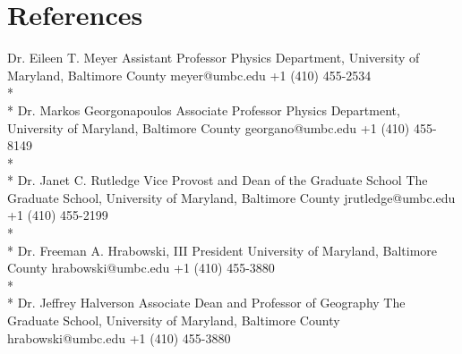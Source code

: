 %
%
%

\section{\texorpdfstring{\color{Blue}References}{References}}

\begin{referees}
		{Dr. Eileen T. Meyer}
		{Assistant Professor}
		{Physics Department, University of Maryland, Baltimore County}
		{meyer@umbc.edu}
		{+1 (410) 455-2534}\\*\\*
		{Dr. Markos Georgonapoulos}
		{Associate Professor}
		{Physics Department, University of Maryland, Baltimore County}
		{georgano@umbc.edu}
		{+1 (410) 455-8149}\\*\\*
		{Dr. Janet C. Rutledge}
		{Vice Provost and Dean of the Graduate School}
		{The Graduate School, University of Maryland, Baltimore County}
		{jrutledge@umbc.edu}
		{+1 (410) 455-2199}\\*\\*
		{Dr. Freeman A. Hrabowski, III}
		{President}
		{University of Maryland, Baltimore County}
		{hrabowski@umbc.edu}
		{+1 (410) 455-3880}\\*\\*
		{Dr. Jeffrey Halverson}
		{Associate Dean and Professor of Geography}
		{The Graduate School, University of Maryland, Baltimore County}
		{hrabowski@umbc.edu}
		{+1 (410) 455-3880}

\end{referees}

